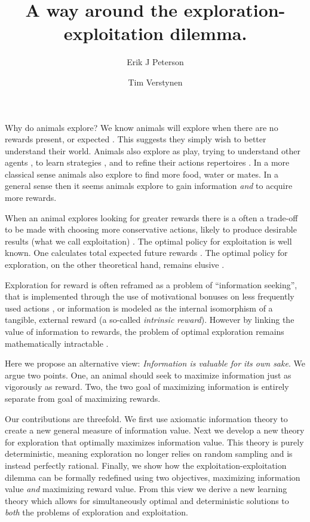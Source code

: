 \documentclass[9pt,twocolumn,twoside]{pnas-new}
\title{A way around the exploration-exploitation dilemma.}
\author[a,1]{Erik J Peterson}
\author[a,b]{Tim Verstynen}
\affil[a]{Department of Psychology}
\affil[b]{Center for the Neural Basis of Cognition, Carnegie Mellon University, Pittsburgh PA}
\begin{document}
\verticaladjustment{-2pt}
\maketitle

\thispagestyle{firststyle}
Why do animals explore? We know animals will explore when there are no rewards present, or expected \cite{TODO}. This suggests they simply wish to better understand their world. Animals also explore as play, trying to understand other agents \cite{TODO}, to learn strategies \cite{TODO}, and to refine their actions repertoires \cite{TODO}. In a more classical sense animals also explore to find more food, water or mates. In a general sense then it seems animals explore to gain information \textit{and} to acquire more rewards.

When an animal explores looking for greater rewards there is a often a trade-off to be made with choosing more conservative actions, likely to produce desirable results (what we call exploitation) \cite{TODO}. The optimal policy for exploitation is well known. One calculates total expected future rewards \cite{TODO}. The optimal policy for exploration, on the other theoretical hand, remains elusive \citep{thrun1992active, dayan1996exploration, findling2018computational, gershman2018deconstructing}. 

Exploration for reward is often reframed as a problem of ``information seeking'', that is implemented through the use of motivational bonuses on less frequently used actions \citep{Sutton1990, dayan1996exploration}, or information is modeled as the internal isomorphism of a tangible, external reward (a so-called \textit{intrinsic reward}). However by linking the value of information to rewards, the problem of optimal exploration remains mathematically intractable \citep{thrun1992active, dayan1996exploration, findling2018computational, gershman2018deconstructing}. 

Here we propose an alternative view: \textit{Information is valuable for its own sake}. We argue two points. One, an animal should seek to maximize information just as vigorously as reward. Two, the two goal of maximizing information is entirely separate from goal of maximizing rewards. 

Our contributions are threefold. We first use axiomatic information theory to create a new general measure of information value. Next we develop a new theory for exploration that optimally maximizes information value. This theory is purely deterministic, meaning exploration no longer relies on random sampling and is instead perfectly rational. Finally, we show how the exploitation-exploitation dilemma can be formally redefined using two objectives, maximizing information value \textit{and} maximizing reward value. From this view we derive a new learning theory which allows for simultaneously optimal and deterministic solutions to \textit{both} the problems of exploration and exploitation.
\end{document}

